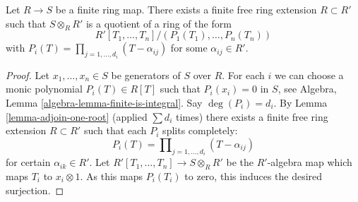 \begin{lemma}
\label{lemma-finite-split}
Let $R \to S$ be a finite ring map.
There exists a finite free ring extension $R \subset R'$ such
that $S \otimes_R R'$ is a quotient of a ring of the form
$$
R'[T_1, \ldots, T_n]/(P_1(T_1), \ldots, P_n(T_n))
$$
with $P_i(T) = \prod_{j = 1, \ldots, d_i} (T - \alpha_{ij})$ for some
$\alpha_{ij} \in R'$.
\end{lemma}

\begin{proof}
Let $x_1, \ldots, x_n \in S$ be generators of $S$ over $R$.
For each $i$ we can choose a monic polynomial $P_i(T) \in R[T]$
such that $P_i(x_i) = 0$ in $S$, see
Algebra, Lemma \ref{algebra-lemma-finite-is-integral}.
Say $\deg(P_i) = d_i$. By
Lemma \ref{lemma-adjoin-one-root}
(applied $\sum d_i$ times) there exists a finite free ring
extension $R \subset R'$ such that each $P_i$ splits completely:
$$
P_i(T) = \prod\nolimits_{j = 1, \ldots, d_i} (T - \alpha_{ij})
$$
for certain $\alpha_{ik} \in R'$. Let
$R'[T_1, \ldots, T_n] \to S \otimes_R R'$ be the $R'$-algebra map
which maps $T_i$ to $x_i \otimes 1$. As this maps $P_i(T_i)$ to zero,
this induces the desired surjection.
\end{proof}
